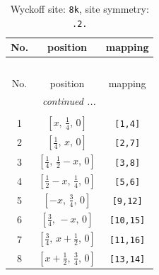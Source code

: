 \documentclass[fleqn,8pt]{jsarticle}
\begin{document}
\begin{longtable}{ccc}
\caption{Wyckoff site: {\tt 8k}, site symmetry: {\tt .2.}}
 \\
 \hline \hline
No. & position & mapping \\ \hline \endfirsthead

\multicolumn{2}{l}{\tablename\ \thetable{}} \\
 \hline \hline
No. & position & mapping \\ \hline \endhead

 \hline \hline
\multicolumn{2}{r}{\footnotesize\it continued ...} \\ \endfoot

 \hline \hline
\multicolumn{2}{r}{} \\ \endlastfoot

1 & $\left[ x,\, \frac{1}{4},\, 0 \right]$ & {\tt [1,4]} \\ \hline
2 & $\left[ \frac{1}{4},\, x,\, 0 \right]$ & {\tt [2,7]} \\ \hline
3 & $\left[ \frac{1}{4},\, \frac{1}{2} - x,\, 0 \right]$ & {\tt [3,8]} \\ \hline
4 & $\left[ \frac{1}{2} - x,\, \frac{1}{4},\, 0 \right]$ & {\tt [5,6]} \\ \hline
5 & $\left[ - x,\, \frac{3}{4},\, 0 \right]$ & {\tt [9,12]} \\ \hline
6 & $\left[ \frac{3}{4},\, - x,\, 0 \right]$ & {\tt [10,15]} \\ \hline
7 & $\left[ \frac{3}{4},\, x + \frac{1}{2},\, 0 \right]$ & {\tt [11,16]} \\ \hline
8 & $\left[ x + \frac{1}{2},\, \frac{3}{4},\, 0 \right]$ & {\tt [13,14]} \\
\end{longtable}
\renewcommand{\arraystretch}{1.2}
\end{document}
